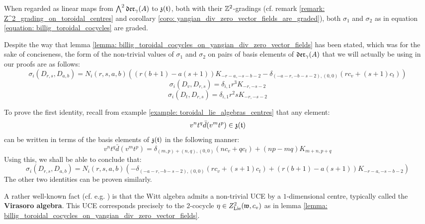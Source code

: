         \begin{corollary} \label{coro: billig_toroidal_cocycles_are_graded}
            When regarded as linear maps from $\bigwedge^2 \mathfrak{der}_{\gamma}(A)$ to $\mathfrak{z}(\mathfrak{t})$, both with their $\mathbb{Z}^2$-gradings (cf. remark \ref{remark: Z^2_grading_on_toroidal_centres} and corollary \ref{coro: yangian_div_zero_vector_fields_are_graded}), both $\sigma_1$ and $\sigma_2$ as in equation \eqref{equation: billig_toroidal_cocycles} are graded. 
        \end{corollary}
        \begin{remark}
            Despite the way that lemma \ref{lemma: billig_toroidal_cocycles_on_yangian_div_zero_vector_fields} has been stated, which was for the sake of conciseness, the form of the non-trivial values of $\sigma_1$ and $\sigma_2$ on pairs of basis elements of $\mathfrak{der}_{\gamma}(A)$ that we will actually be using in our proofs are as follows:
                $$\sigma_i(D_{r, s}, D_{a, b}) = N_i(r, s, a, b) \left( ( r(b + 1) - a(s + 1) )K_{-r - a, -s - b - 2} - \delta_{ (-a - r, -b - s - 2), (0, 0) } (r c_v + (s + 1) c_t) \right)$$
                $$\sigma_i(D_v, D_{r, s}) = \delta_{i, 1} r^3 K_{-r, -s - 2}$$
                $$\sigma_i(D_t, D_{r, s}) = \delta_{i, 1} r^2 s K_{-r, -s - 2}$$
                
            To prove the first identity, recall from example \ref{example: toroidal_lie_algebras_centres} that any element:
                $$v^n t^q \bar{d}(v^m t^p) \in \mathfrak{z}(\mathfrak{t})$$
            can be written in terms of the basis elements of $\mathfrak{z}(\mathfrak{t})$ in the following manner:
                $$v^n t^q \bar{d}(v^m t^p) = \delta_{(m, p) + (n, q), (0, 0)} ( n c_v + q c_t ) + (np - mq) K_{m + n, p + q}$$
            Using this, we shall be able to conclude that:
                $$\sigma_i(D_{r, s}, D_{a, b}) = N_i(r, s, a, b) \left( -\delta_{ (-a - r, -b - s - 2), (0, 0) } (r c_v + (s + 1) c_t) + ( r(b + 1) - a(s + 1) )K_{-r - a, -s - b - 2} \right)$$
            The other two identities can be proven similarly.
        \end{remark}
        \begin{remark} \label{remark: billig_toroidal_cocycles_on_the_witt_algebra}
            A rather well-known fact (cf. e.g. \cite[Proposition 1.3]{kac_raina_rozhkovskaya_bombay_lectures_on_highest_weight_modules_of_infinite_dimensional_lie_algebras}) is that the Witt algebra admits a non-trivial UCE by a $1$-dimensional centre, typically called the \textbf{Virasoro algebra}. This UCE corresponds precisely to the $2$-cocycle $\eta \in Z^2_{\mathrm{Lie}}(\mathfrak{w}, c_v)$ as in lemma \ref{lemma: billig_toroidal_cocycles_on_yangian_div_zero_vector_fields}. 
        \end{remark}

